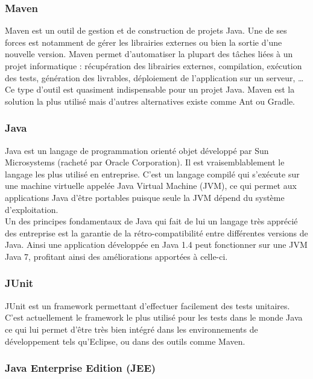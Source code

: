 \subsubsection{Maven}

Maven \cite{maven} est un outil de gestion et de construction de projets Java. Une de ses forces est notamment de gérer les librairies externes ou bien la sortie d'une nouvelle version. Maven permet d'automatiser la plupart des tâches liées à un projet informatique : récupération des librairies externes, compilation, exécution des tests, génération des livrables, déploiement de l'application sur un serveur, \dots Ce type d'outil est quasiment indispensable pour un projet Java. Maven est la solution la plus utilisé mais d'autres alternatives existe comme Ant ou Gradle. 

\subsubsection{Java}

Java \cite{java} est un langage de programmation orienté objet développé par Sun Microsystems (racheté par Oracle Corporation). Il est vraisemblablement le langage les plus utilisé en entreprise. C'est un langage compilé qui s'exécute sur une machine virtuelle appelée Java Virtual Machine (JVM), ce qui permet aux applications Java d'être portables puisque seule la JVM dépend du système d'exploitation.\\

Un des principes fondamentaux de Java qui fait de lui un langage très apprécié des entreprise est la garantie de la rétro-compatibilité entre différentes versions de Java. Ainsi une application développée en Java 1.4 peut fonctionner sur une JVM Java 7, profitant ainsi des améliorations apportées à celle-ci.

\subsubsection{JUnit}

JUnit \cite{junit} est un framework permettant d'effectuer facilement des tests unitaires. C'est actuellement le framework le plus utilisé pour les tests dans le monde Java ce qui lui permet d'être très bien intégré dans les environnements de développement tels qu'Eclipse, ou dans des outils comme Maven.

\subsubsection{Java Enterprise Edition (JEE)}


